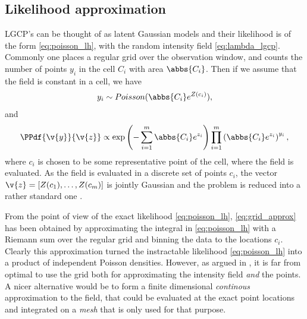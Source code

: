 \documentclass[12pt,a4paper,oneside,article]{memoir}
\begin{document}
\subsection{Likelihood approximation}

LGCP's can be thought of as latent Gaussian models and their likelihood
is of the form \eqref{eq:poisson_lh}, with the random intensity field \eqref{eq:lambda_lgcp}.
Commonly one places a regular grid over the observation window, and counts
the number of points $y_i$ in the cell $C_i$ with area $\abbs{C_i}$. Then if we assume
that the field is constant in a cell, we have
\begin{align}
	y_i\sim Poisson(\abbs{C_i}e^{Z(c_i)}), 
	\label{eq:grid_approx_single}
\end{align}
and
\begin{align}
	\PPdf{\v{y}}{\v{z}}\propto \exp\left(-\sum_{i=1}^m\abbs{C_i}e^{z_i}\right)\prod_{i=1}^m
	\left(\abbs{C_i}e^{z_i}\right)^{y_i},
	\label{eq:grid_approx}
\end{align}
where $c_i$ is chosen to be some representative point of the cell, where the field is evaluated.
As the field is evaluated in a discrete set of points $c_i$, the vector $\v{z}=\left[Z(c_1),\dots,Z(c_m)\right]$
is jointly Gaussian and the problem is reduced into a rather standard one \cite{Simpson2011}.

From the point of view of the exact likelihood \eqref{eq:poisson_lh}, \eqref{eq:grid_approx}
has been obtained by approximating the integral in \eqref{eq:poisson_lh} with a Riemann sum
over the regular grid and binning the data to the locations $c_i$. Clearly this approximation
turned the instractable likelihood \eqref{eq:poisson_lh} into a product of independent Poisson densities. 
However, as argued in \cite{Simpson2011}, it is far from optimal to use the grid both for approximating the intensity
field \emph{and} the points.
A nicer alternative would be to 
form a finite dimensional \emph{continous} approximation to the field, that could be evaluated at 
the exact point locations and integrated on a \emph{mesh} that is only used for that purpose.
\end{document}
